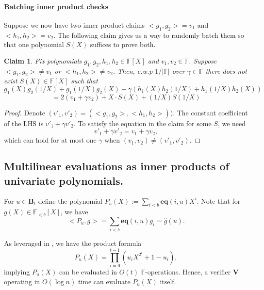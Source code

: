 \documentclass[11pt]{article} %
\newcommand{\F}{\ensuremath{\mathbb F}\xspace}
\newcommand{\defeq}{:=}
\newcommand{\prv}{\ensuremath{\mathsf{\mathbf{P}}}\xspace}
\newcommand{\ver}{\ensuremath{\mathsf{\mathbf{V}}}\xspace}
\newcommand{\polysofdeg}[1]{\ensuremath{\F_{< #1}[X]}\xspace}
\newcommand{\polys}{\ensuremath{\F[X]}\xspace}
\newcommand{\sumi}[1]{\sum_{i< #1}}
\newtheorem{claim}[lemma]{Claim}
\newcommand{\eq}{\ensuremath{\mathsf{eq}}\xspace}
\renewcommand{\eq}{\ensuremath{\mathbf{eq}}\xspace}
\newcommand{\eqpol}[1]{\ensuremath{P_{#1}}\xspace}
\newcommand{\mle}[1]{\ensuremath{\hat{#1}}\xspace}
\newcommand{\prodt}{\ensuremath{\prod_{i=0}^{t-1}}\xspace}
\newcommand{\B}[1]{\ensuremath{\mathbf{B}_{#1}}\xspace}
\newcommand{\xinv}{\ensuremath{1/X}\xspace}
\begin{document}
\paragraph{Batching inner product checks}

Suppose we now have two  inner product claims  $<g_1,g_2>=v_1$ and $<h_1,h_2>=v_2$. 
The following claim gives us a way to randomly batch them so that one polynomial $S(X)$ suffices to prove both.
\begin{claim}\label{claim:batchipa}
 Fix polynomials $g_1,g_2,h_1,h_2\in \polys$ and $v_1,v_2\in \F$.
 Suppose $<g_1,g_2>\neq v_1$ or $<h_1,h_2>\neq v_2$. Then, e.w.p $1/|\F|$ over $\gamma\in \F$
 there does not exist $S(X)\in\polys$ such that
\[ g_1(X)g_2(\xinv)+ g_1(\xinv) g_2(X) + \gamma(h_1(X)h_2(\xinv) + h_1(\xinv)h_2(X)) \]
\[= 2(v_1+\gamma v_2) + X\cdot S(X)+(\xinv)S(\xinv)\]
 
\end{claim}
\begin{proof}
Denote $(v'_1,v'_2)=(<g_1,g_2>,<h_1,h_2>))$.
 The constant coefficient of the LHS is $v'_1+\gamma v'_2$.
To satisfy the equation in the claim for some $S$, we need
 \[v'_1+\gamma v'_2=v_1+\gamma v_2,\]
which can hold for at most one $\gamma$ when $(v_1,v_2)\neq (v'_1,v'_2)$.
\end{proof}

\subsection{Multilinear evaluations as inner products of univariate polynomials.}
For $u\in \B{t}$ define the polynomial $\eqpol{u} (X)\defeq  \sumi{b}\eq(i,u)X^i$. 
Note that for $g(X)\in \polysofdeg{b}$, we have
\[<\eqpol{u},g>=\sumi{b}\eq(i,u) g_i = \mle{g}(u).\]

\noindent
As leveraged in \cite{halo}, we have the product formula
\[\eqpol{u}(X)=\prodt\left(u_i X^{2^i}+1-u_i\right),
\]
implying $\eqpol{u}(X)$ can be evaluated in $O(t)$ \F-operations. Hence, a verifier \ver operating in $O(\log n)$ time can evaluate $\eqpol{u}(X)$ itself.
\end{document}
